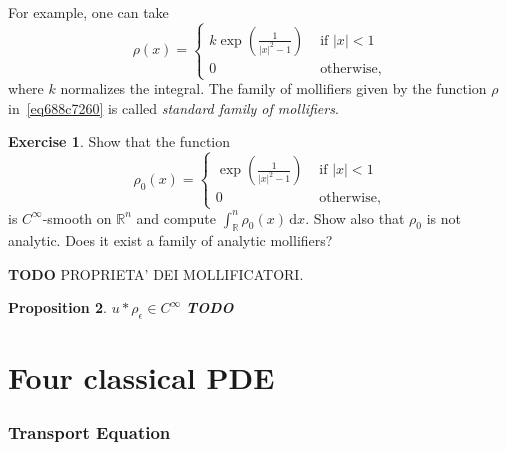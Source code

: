 \documentclass[a4paper,9pt]{amsart}
\newcommand{\R}{\mathbb{R}}	%
\newcommand{\did}{\,\mathrm{d}}	%
\newcommand{\TODO}{{\bf\color{Red}TODO}}
\theoremstyle{plain}
\newtheorem{proposition}{Proposition}[section]
\theoremstyle{definition}
\newtheorem{exercise}[proposition]{Exercise}%
\theoremstyle{remark}
\begin{document}
For example, one can take
\begin{equation}\label{eq688c7260}
	\rho(x) = \begin{cases}
	k \exp\left(\frac{1}{|x|^2-1}\right) & \text{ if }|x|<1 \\
	0 & \text{ otherwise} ,
	\end{cases}
\end{equation}
where $k$ normalizes the integral.
The family of mollifiers given by the function $\rho$ in~\eqref{eq688c7260} is called \emph{standard family of mollifiers}.

\begin{exercise}
	Show that the function 
	\begin{equation}
		\rho_0(x) = \begin{cases}
		\exp\left(\frac{1}{|x|^2-1}\right) & \text{ if }|x|<1 \\
		0 & \text{ otherwise} ,
		\end{cases}
	\end{equation}
	is $C^\infty$-smooth on $\R^n$ and compute $\int_\R^n \rho_0(x)\did x$.
	Show also that $\rho_0$ is not analytic.
	Does it exist a family of analytic mollifiers?	
%	
\end{exercise}

\TODO
PROPRIETA' DEI MOLLIFICATORI.

\begin{proposition}\label{prop688c72e1}
	$u*\rho_\epsilon\in C^\infty$ \TODO
\end{proposition}



\newpage
\part{Four classical PDE}

\section{Transport Equation}
\end{document}
